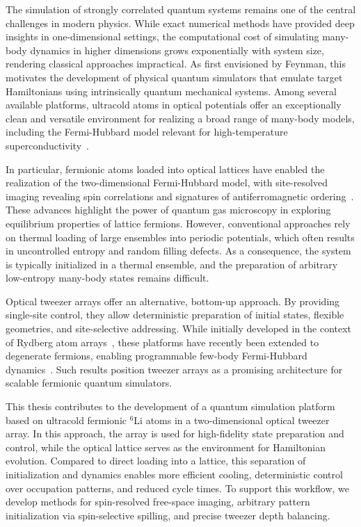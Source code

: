 

The simulation of strongly correlated quantum systems remains one of the central challenges in modern physics. While exact numerical methods have provided deep insights in one-dimensional settings, the computational cost of simulating many-body dynamics in higher dimensions grows exponentially with system size, rendering classical approaches impractical. As first envisioned by Feynman, this motivates the development of physical quantum simulators that emulate target Hamiltonians using intrinsically quantum mechanical systems. Among several available platforms, ultracold atoms in optical potentials offer an exceptionally clean and versatile environment for realizing a broad range of many-body models, including the Fermi-Hubbard model relevant for high-temperature superconductivity~\cite{esslinger_fermi-hubbard_2010, gross_quantum_2017}.

In particular, fermionic atoms loaded into optical lattices have enabled the realization of the two-dimensional Fermi-Hubbard model, with site-resolved imaging revealing spin correlations and signatures of antiferromagnetic ordering~\cite{parsons_site-resolved_2016, boll_spin-_2016}. These advances highlight the power of quantum gas microscopy in exploring equilibrium properties of lattice fermions. However, conventional approaches rely on thermal loading of large ensembles into periodic potentials, which often results in uncontrolled entropy and random filling defects. As a consequence, the system is typically initialized in a thermal ensemble, and the preparation of arbitrary low-entropy many-body states remains difficult.

Optical tweezer arrays offer an alternative, bottom-up approach. By providing single-site control, they allow deterministic preparation of initial states, flexible geometries, and site-selective addressing. While initially developed in the context of Rydberg atom arrays~\cite{browaeys_many-body_2020}, these platforms have recently been extended to degenerate fermions, enabling programmable few-body Fermi-Hubbard dynamics~\cite{spar_realization_2022, yan_two-dimensional_2022}. Such results position tweezer arrays as a promising architecture for scalable fermionic quantum simulators.

This thesis contributes to the development of a quantum simulation platform based on ultracold fermionic $^6$Li atoms in a two-dimensional optical tweezer array. In this approach, the array is used for high-fidelity state preparation and control, while the optical lattice serves as the environment for Hamiltonian evolution. Compared to direct loading into a lattice, this separation of initialization and dynamics enables more efficient cooling, deterministic control over occupation patterns, and reduced cycle times. To support this workflow, we develop methods for spin-resolved free-space imaging, arbitrary pattern initialization via spin-selective spilling, and precise tweezer depth balancing.

